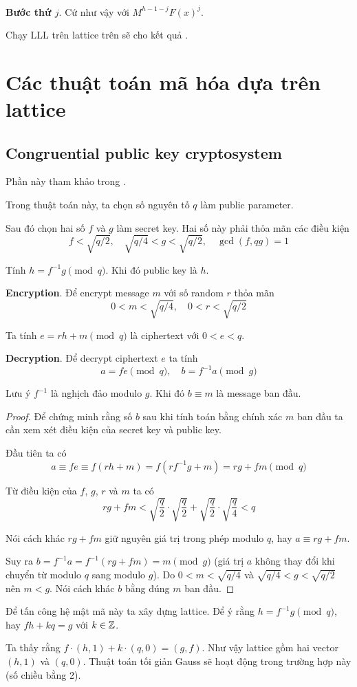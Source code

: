 \textbf{Bước thứ $j$}. Cứ như vậy với $M^{h-1-j}F(x)^j$​.

Chạy LLL trên lattice trên sẽ cho kết quả .

\section{Các thuật toán mã hóa dựa trên lattice}

\subsection*{Congruential public key cryptosystem}

Phần này tham khảo trong \cite{Hoffstein2014}.

Trong thuật toán này, ta chọn số nguyên tố $q$ làm public parameter.

Sau đó chọn hai số $f$ và $g$ làm secret key. Hai số này phải thỏa mãn các điều kiện \[ f < \sqrt{q/2}, \quad \sqrt{q/4} < g < \sqrt{q/2}, \quad \gcd(f, qg) = 1 \]

Tính $h = f^{-1} g \pmod q$. Khi đó public key là $h$.

\textbf{Encryption}. Để encrypt message $m$ với số random $r$ thỏa mãn \[ 0 < m < \sqrt{q/4}, \quad 0 < r < \sqrt{q/2} \]

Ta tính $e = rh + m \pmod q$ là ciphertext với $0 < e < q$.

\textbf{Decryption}. Để decrypt ciphertext $e$ ta tính \[ a = fe \pmod q, \quad b = f^{-1} a \pmod g \]

Lưu ý $f^{-1}$ là nghịch đảo modulo $g$. Khi đó $b \equiv m$ là message ban đầu.

\begin{proof}
    Để chứng minh rằng số $b$ sau khi tính toán bằng chính xác $m$ ban đầu ta cần xem xét điều kiện của secret key và public key.

    Đầu tiên ta có \[ a \equiv fe \equiv f(rh + m) = f(r f^{-1} g + m) = rg + fm \pmod q \]

    Từ điều kiện của $f$, $g$, $r$ và $m$ ta có \[ rg + fm < \sqrt{\dfrac{q}{2}} \cdot \sqrt{\dfrac{q}{2}} + \sqrt{\dfrac{q}{2}} \cdot \sqrt{\dfrac{q}{4}} < q \]

    Nói cách khác $rg + fm$ giữ nguyên giá trị trong phép modulo $q$, hay $a \equiv rg + fm$.

    Suy ra $b = f^{-1} a = f^{-1} (rg + fm) = m \pmod g$ (giá trị $a$ không thay đổi khi chuyển từ modulo $q$ sang modulo $g$). Do $0 < m < \sqrt{q/4}$ và $\sqrt{q/4} < g < \sqrt{q/2}$ nên $m < g$. Nói cách khác $b$ bằng đúng $m$ ban đầu.
\end{proof}

Để tấn công hệ mật mã này ta xây dựng lattice. Để ý rằng $h = f^{-1} g \pmod q$, hay $fh + kq = g$ với $k \in \mathbb{Z}$.

Ta thấy rằng $f \cdot (h, 1) + k \cdot (q, 0) = (g, f)$. Như vậy lattice gồm hai vector $(h, 1)$ và $(q, 0)$. Thuật toán tối giản Gauss sẽ hoạt động trong trường hợp này (số chiều bằng 2).
